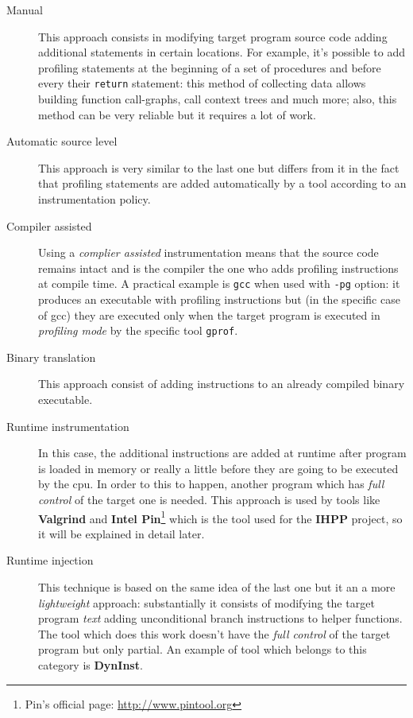 \documentclass[a4paper,11pt]{report}
\begin{document}
\begin{description}
\begin{description}
\item[Manual]
This approach consists in modifying target program source code adding additional
statements in certain locations. For example, it's possible to add profiling
statements at the beginning of a set of procedures and before every their
\verb|return| statement: this method of collecting data allows building function
call-graphs, call context trees and much more; also, this method can be very
reliable but it requires a lot of work.

\item[Automatic source level] This approach is very similar to the last one but
differs from it in the fact that profiling statements are added automatically by
a tool according to an instrumentation policy.

\item[Compiler assisted] Using a \emph{complier assisted} instrumentation means
that the source code remains intact and is the compiler the one who adds
profiling instructions at compile time. A practical example is \verb|gcc| when
used with \verb|-pg| option: it produces an executable with profiling
instructions but (in the specific case of gcc) they are executed only when the
target program is executed in \emph{profiling mode} by the specific tool
\verb|gprof|.

\item[Binary translation]
This approach consist of adding instructions to an already compiled binary executable.

\item[Runtime instrumentation]
In this case, the additional instructions are added at runtime after program is
loaded in memory or really a little before they are going to be executed by the
cpu. In order to this to happen, another program which has \emph{full control}
of the target one is needed. This approach is used by tools like
\textbf{Valgrind} and \textbf{Intel Pin}\footnote{Pin's official page:
\url{http://www.pintool.org}} which is the tool used for the \textbf{IHPP}
project, so it will be explained in detail later.

\item[Runtime injection] This technique is based on the same idea of the last
one but it an a more \emph{lightweight} approach: substantially it consists of
modifying the target program \emph{text} adding unconditional branch
instructions to helper functions. The tool which does this work doesn't have the
\emph{full control} of the target program but only partial. An example of tool
which belongs to this category is \textbf{DynInst}.


\end{description}
\end{description}
\end{document}
